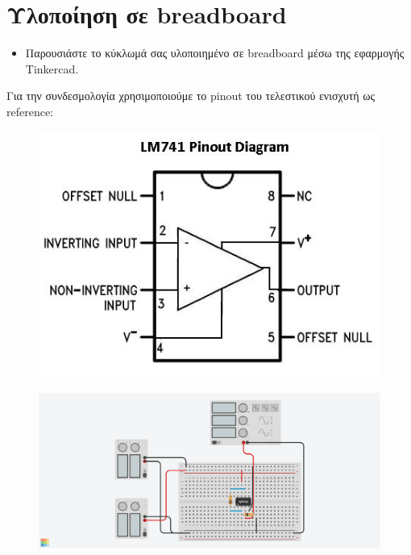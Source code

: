 \documentclass[12pt]{article}
\begin{document}
\section{Υλοποίηση σε breadboard}

\begin{itemize}
	\item Παρουσιάστε το κύκλωμά σας υλοποιημένο σε breadboard μέσω
		της εφαρμογής Tinkercad.
\end{itemize}

Για την συνδεσμολογία χρησιμοποιούμε το pinout του τελεστικού ενισχυτή ως reference:
\begin{figure}[H]
	\centering
	\includegraphics{./res/pinout.jpg}
\end{figure}

\begin{figure}[H]
	\centering
	\includegraphics[width=\linewidth]{./res/bread.jpg}
\end{figure}
\end{document}
